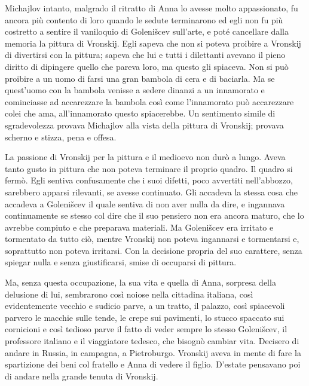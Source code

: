 Michajlov intanto, malgrado il ritratto di Anna lo avesse molto appassionato, fu ancora più contento di loro quando le sedute terminarono ed egli non fu più costretto a sentire il vaniloquio di Golenišcev sull'arte, e poté cancellare dalla memoria la pittura di Vronskij. Egli sapeva che non si poteva proibire a Vronskij di divertirsi con la pittura; sapeva che lui e tutti i dilettanti avevano il pieno diritto di dipingere quello che pareva loro, ma questo gli spiaceva. Non si può proibire a un uomo di farsi una gran bambola di cera e di baciarla. Ma se quest'uomo con la bambola venisse a sedere dinanzi a un innamorato e cominciasse ad accarezzare la bambola così come l'innamorato può accarezzare colei che ama, all'innamorato questo spiacerebbe. Un sentimento simile di sgradevolezza provava Michajlov alla vista della pittura di Vronskij; provava scherno e stizza, pena e offesa. 

La passione di Vronskij per la pittura e il medioevo non durò a lungo. Aveva tanto gusto in pittura che non poteva terminare il proprio quadro. Il quadro si fermò. Egli sentiva confusamente che i suoi difetti, poco avvertiti nell'abbozzo, sarebbero apparsi rilevanti, se avesse continuato. Gli accadeva la stessa cosa che accadeva a Golenišcev il quale sentiva di non aver nulla da dire, e ingannava continuamente se stesso col dire che il suo pensiero non era ancora maturo, che lo avrebbe compiuto e che preparava materiali. Ma Golenišcev era irritato e tormentato da tutto ciò, mentre Vronskij non poteva ingannarsi e tormentarsi e, soprattutto non poteva irritarsi. Con la decisione propria del suo carattere, senza spiegar nulla e senza giustificarsi, smise di occuparsi di pittura. 

Ma, senza questa occupazione, la sua vita e quella di Anna, sorpresa della delusione di lui, sembrarono così noiose nella cittadina italiana, così evidentemente vecchio e sudicio parve, a un tratto, il palazzo, così spiacevoli parvero le macchie sulle tende, le crepe sui pavimenti, lo stucco spaccato sui cornicioni e così tedioso parve il fatto di veder sempre lo stesso Golenišcev, il professore italiano e il viaggiatore tedesco, che bisognò cambiar vita. Decisero di andare in Russia, in campagna, a Pietroburgo. Vronskij aveva in mente di fare la spartizione dei beni col fratello e Anna di vedere il figlio. D'estate pensavano poi di andare nella grande tenuta di Vronskij. 

\label{xiv-4} 

